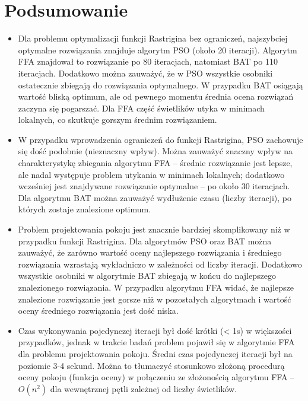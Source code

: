 \pagebreak
\section{Podsumowanie}
\begin{itemize}
  \item{Dla problemu optymalizacji funkcji Rastrigina bez ograniczeń, najszybciej optymalne rozwiązania znajduje algorytm PSO (około 20 iteracji).
        Algorytm FFA znajdował to rozwiązanie po 80 iteracjach, natomiast BAT po 110 iteracjach. Dodatkowo można zauważyć, że w PSO wszystkie osobniki
        ostatecznie zbiegają do rozwiązania optymalnego. W przypadku BAT osiągają wartość bliską optimum, ale od pewnego momentu średnia ocena rozwiązań
        zaczyna się pogarszać. Dla FFA część świetlików utyka w minimach lokalnych, co skutkuje gorszym średnim rozwiązaniem.}
  \item{W przypadku wprowadzenia ograniczeń do funkcji Rastrigina, PSO zachowuje się dość podobnie (nieznaczny wpływ). Można zauważyć znaczny wpływ na
        charakterystykę zbiegania algorytmu FFA -- średnie rozwiązanie jest lepsze, ale nadal występuje problem utykania w minimach lokalnych; dodatkowo
        wcześniej jest znajdywane rozwiązanie optymalne -- po około 30 iteracjach. Dla algorytmu BAT można zauważyć wydłużenie czasu (liczby iteracji),
        po których zostaje znalezione optimum.}
  \item{Problem projektowania pokoju jest znacznie bardziej skomplikowany niż w przypadku funkcji Rastrigina. Dla algorytmów PSO oraz BAT można zauważyć,
        że zarówno wartość oceny najlepszego rozwiązania i średniego rozwiązania wzrastają wykładniczo w zależności od liczby iteracji. Dodatkowo wszystkie
        osobniki w algorytmie BAT zbiegają w końcu do najlepszego znalezionego rozwiązania. W przypadku algorytmu FFA widać, że najlepsze znalezione 
        rozwiązanie jest gorsze niż w pozostałych algorytmach i wartość oceny średniego rozwiązania jest dość niska.}  
  \item{Czas wykonywania pojedynczej iteracji był dość krótki (< 1s) w większości przypadków, jednak w trakcie badań problem pojawił się w algorytmie FFA
        dla problemu projektowania pokoju. Średni czas pojedynczej iteracji był na poziomie 3-4 sekund. Można to tłumaczyć stosunkowo złożoną procedurą oceny
        pokoju (funkcja oceny) w połączeniu ze złożonością algorytmu FFA -- $O(n^2)$ dla wewnętrznej pętli zależnej od liczby świetlików.}
\end{itemize}
